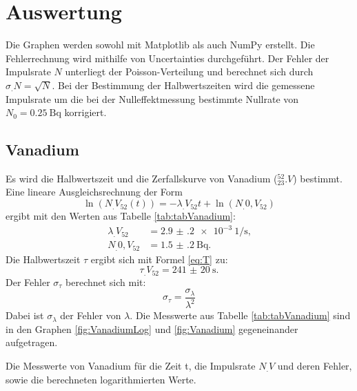 \section{Auswertung}
\label{sec:Auswertung}

Die Graphen werden sowohl mit Matplotlib \cite{matplotlib} als auch NumPy \cite{numpy} erstellt. Die Fehlerrechnung wird mithilfe von Uncertainties \cite{uncertainties} durchgeführt. Der Fehler der Impulsrate $N$ unterliegt der Poisson-Verteilung und berechnet sich durch $\sigma_.N=\sqrt{N}$. Bei der Bestimmung der Halbwertszeiten wird die gemessene Impulsrate um die bei der Nulleffektmessung bestimmte Nullrate von $N_0=\SI{0.25}{\becquerel}$ korrigiert.

\subsection{Vanadium}

Es wird die Halbwertszeit und die Zerfallskurve von Vanadium ($^{52}_{23}.V$) bestimmt.
Eine lineare Ausgleichsrechnung der Form \[\ln(N_.{V_{52}}(t))=-\lambda_.{V_{52}} t+\ln(N_.{0,V_{52}})\] ergibt mit den Werten aus Tabelle \ref{tab:tabVanadium}:
\begin{align*}
\lambda_.{V_{52}}	&= \SI{2.9(2)e-3}{1\per\second}\text{,}\\
N_.{0,V_{52}} 		&= \SI{1.5(2)}{\becquerel}\text{.}
\end{align*}
Die Halbwertszeit $\tau$ ergibt sich mit Formel \eqref{eq:T} zu:
\begin{equation*}
\tau_.{V_{52}} = \SI{241(20)}{\second}\text{.}
\end{equation*}
Der Fehler $\sigma_{\tau}$ berechnet sich mit:
\begin{equation}
\sigma_{\tau} = \frac{\sigma_{\lambda}}{\lambda^2}\label{eq:sigma_tau}
\end{equation}
Dabei ist $\sigma_{\lambda}$ der Fehler von $\lambda$. Die Messwerte aus Tabelle \ref{tab:tabVanadium} sind in den Graphen \ref{fig:VanadiumLog} und \ref{fig:Vanadium} gegeneinander aufgetragen.

\begin{table}
	\centering
	\caption{Die Messwerte von Vanadium für die Zeit t, die Impulsrate $N_.V$ und deren Fehler, sowie die berechneten logarithmierten Werte.}
	
	\label{tab:tabVanadium}
\end{table}


